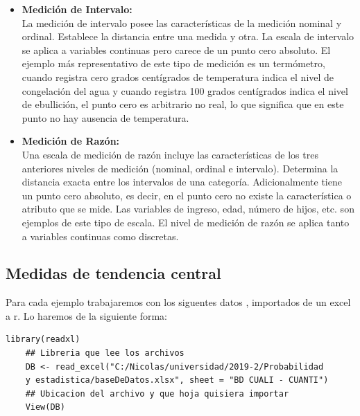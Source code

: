 \documentclass[12pt,hidelinks]{article}
\begin{document}
\begin{itemize}
		\item  \textbf{Medición de Intervalo:}\\ 
		\vspace{2mm} 
		La medición de intervalo posee las características de la medición nominal y ordinal. Establece la distancia entre una medida y otra. La escala de intervalo se aplica a variables continuas pero carece de un punto cero absoluto. El ejemplo más representativo de este tipo de medición es un termómetro, cuando registra cero grados centígrados de temperatura indica el nivel de congelación del agua y cuando registra 100 grados centígrados indica el nivel de ebullición, el punto cero es arbitrario no real, lo que significa que en este punto no hay ausencia de temperatura. 
		\item \textbf{Medición de Razón:}\\
		\vspace{2mm}
		Una escala de medición de razón incluye las características de los tres anteriores niveles de medición (nominal, ordinal e intervalo). Determina la distancia exacta entre los intervalos de una categoría. Adicionalmente tiene un punto cero absoluto, es decir, en el punto cero no existe la característica o atributo que se mide. Las variables de ingreso, edad, número de hijos, etc. son ejemplos de este tipo de escala. El nivel de medición de razón se aplica tanto a variables continuas como discretas. 
	\end{itemize}
	
	\newpage
	\subsection{Medidas de tendencia central}
	Para cada ejemplo trabajaremos con los siguentes datos , importados de un excel a r. Lo haremos de la siguiente forma:
	\begin{lstlisting}[frame=single]
	library(readxl)
	## Libreria que lee los archivos 
	DB <- read_excel("C:/Nicolas/universidad/2019-2/Probabilidad
	y estadistica/baseDeDatos.xlsx", sheet = "BD CUALI - CUANTI")        
	## Ubicacion del archivo y que hoja quisiera importar 
	View(DB)
	\end{lstlisting}
	
	
\end{document}
